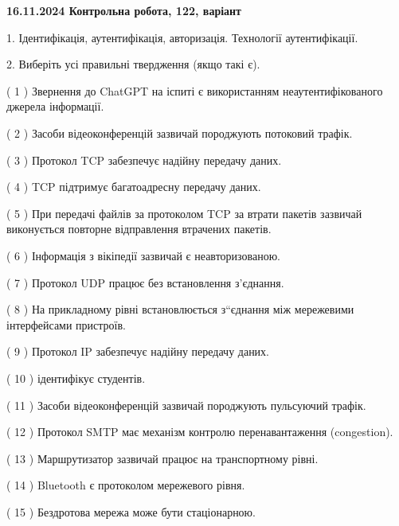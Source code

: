 \documentclass[12pt, ukrainian]{article}
\begin{document}
\vspace{4mm}
\newpage
\begin {large}

\textbf{16.11.2024 Контрольна робота, 122, варіант  }\par


{
1. Ідентифікація, аутентифікація, авторизація. Технології аутентифікації.



\vspace{5mm}
2. Виберіть усі правильні твердження (якщо такі є).\par
\vspace{2mm}

( 1 ) Звернення до ChatGPT на іспиті є використанням неаутентифікованого джерела інформації.

( 2 ) Засоби відеоконференцій зазвичай породжують потоковий трафік.

( 3 ) Протокол TCP забезпечує надійну передачу даних.

( 4 ) TCP підтримує багатоадресну передачу даних.

( 5 ) При передачі файлів за протоколом TCP за втрати пакетів зазвичай виконується повторне відправлення втрачених пакетів.

( 6 ) Інформація з вікіпедії зазвичай є неавторизованою.

( 7 ) Протокол UDP працює без встановлення з'єднання.

( 8 ) На прикладному рівні встановлюється з“єднання між мережевими інтерфейсами пристроїв.

( 9 ) Протокол IP забезпечує надійну передачу даних.

( 10 ) ідентифікує студентів.

( 11 ) Засоби відеоконференцій зазвичай породжують пульсуючий трафік.

( 12 ) Протокол SMTP має механізм контролю перенавантаження (congestion).

( 13 ) Маршрутизатор зазвичай працює на транспортному рівні.

( 14 ) Bluetooth є протоколом мережевого рівня.

( 15 ) Бездротова мережа може бути стаціонарною.
}
\end {large}
\end{document}
